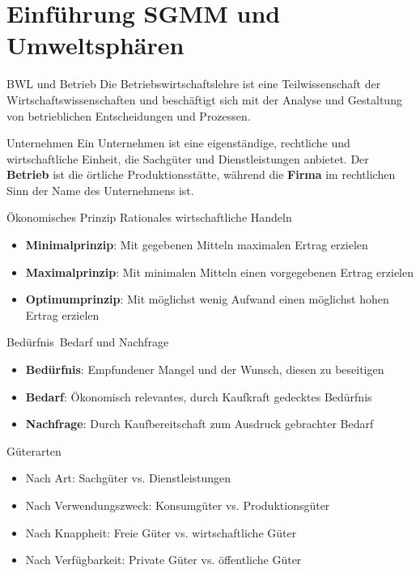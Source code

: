 \section{Einführung SGMM und Umweltsphären}

\small

\begin{definition}{BWL und Betrieb} \small
Die Betriebswirtschaftslehre ist eine Teilwissenschaft der Wirtschaftswissenschaften und beschäftigt sich mit der Analyse und Gestaltung von betrieblichen Entscheidungen und Prozessen.
\end{definition}

\begin{definition}{Unternehmen} \small
Ein Unternehmen ist eine eigenständige, rechtliche und wirtschaftliche Einheit, die Sachgüter und Dienstleistungen anbietet. Der \textbf{Betrieb} ist die örtliche Produktionsstätte, während die \textbf{Firma} im rechtlichen Sinn der Name des Unternehmens ist.
\end{definition}


\begin{concept}{Ökonomisches Prinzip}
Rationales wirtschaftliche Handeln
\begin{itemize}
    \item \textbf{Minimalprinzip}: Mit gegebenen Mitteln maximalen Ertrag erzielen
    \item \textbf{Maximalprinzip}: Mit minimalen Mitteln einen vorgegebenen Ertrag erzielen
    \item \textbf{Optimumprinzip}: Mit möglichst wenig Aufwand einen möglichst hohen Ertrag erzielen
\end{itemize}
\end{concept}

\begin{concept}{Bedürfnis\, Bedarf und Nachfrage}
\begin{itemize}
    \item \textbf{Bedürfnis}: Empfundener Mangel und der Wunsch, diesen zu beseitigen
    \item \textbf{Bedarf}: Ökonomisch relevantes, durch Kaufkraft gedecktes Bedürfnis
    \item \textbf{Nachfrage}: Durch Kaufbereitschaft zum Ausdruck gebrachter Bedarf
\end{itemize}
\end{concept}

\begin{definition}{Güterarten}
\begin{itemize}
    \item Nach Art: Sachgüter vs. Dienstleistungen
    \item Nach Verwendungszweck: Konsumgüter vs. Produktionsgüter
    \item Nach Knappheit: Freie Güter vs. wirtschaftliche Güter
    \item Nach Verfügbarkeit: Private Güter vs. öffentliche Güter
\end{itemize}
\end{definition}

